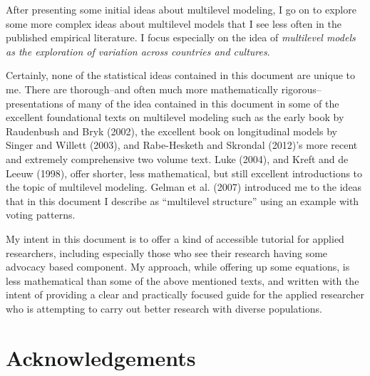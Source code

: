 \documentclass[
  letterpaper,
  DIV=11,
  numbers=noendperiod]{scrreprt}
\begin{document}
After presenting some initial ideas about multilevel modeling, I go on
to explore some more complex ideas about multilevel models that I see
less often in the published empirical literature. I focus especially on
the idea of \emph{multilevel models as the exploration of variation
across countries and cultures}.

Certainly, none of the statistical ideas contained in this document are
unique to me. There are thorough--and often much more mathematically
rigorous--presentations of many of the idea contained in this document
in some of the excellent foundational texts on multilevel modeling such
as the early book by Raudenbush and Bryk (2002), the excellent book on
longitudinal models by Singer and Willett (2003), and Rabe-Hesketh and
Skrondal (2012)'s more recent and extremely comprehensive two volume
text. Luke (2004), and Kreft and de Leeuw (1998), offer shorter, less
mathematical, but still excellent introductions to the topic of
multilevel modeling. Gelman et al. (2007) introduced me to the ideas
that in this document I describe as ``multilevel structure'' using an
example with voting patterns.

My intent in this document is to offer a kind of accessible tutorial for
applied researchers, including especially those who see their research
having some advocacy based component. My approach, while offering up
some equations, is less mathematical than some of the above mentioned
texts, and written with the intent of providing a clear and practically
focused guide for the applied researcher who is attempting to carry out
better research with diverse populations.


\hypertarget{acknowledgements}{%
\chapter*{Acknowledgements}\label{acknowledgements}}

\end{document}
